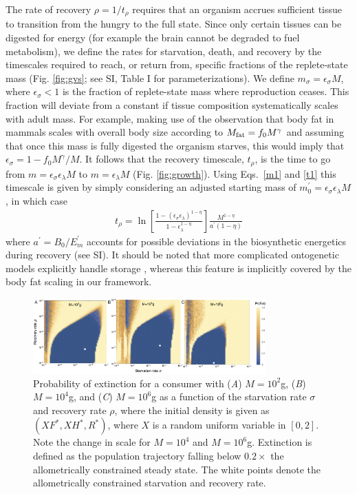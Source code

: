 \documentclass{pnastwo}
\begin{document}
\begin{article}
The rate of recovery $\rho = 1/t_\rho$ requires that an organism accrues
sufficient tissue to transition from the hungry to the full state.  Since
only certain tissues can be digested for energy (for example the brain cannot
be degraded to fuel metabolism), we define the rates for starvation, death,
and recovery by the timescales required to reach, or return from, specific
fractions of the replete-state mass (Fig. \ref{fig:gvs}; see SI, Table I for parameterizations).  We define
$m_{\sigma}=\epsilon_{\sigma} M$, where $\epsilon_{\sigma}<1$ is the fraction of
replete-state mass where reproduction ceases. This fraction will deviate from a constant
if tissue composition systematically scales with adult mass.  For example,
making use of the observation that body fat in mammals scales with overall
body size according to $M_{\rm fat}=f_{0}M^{\gamma}$ and assuming that once
this mass is fully digested the organism starves, this would imply that
$\epsilon_{\sigma}=1-f_{0}M^{\gamma}/M$. It follows that the
recovery timescale, $t_{\rho}$, is the time to go from
$m=\epsilon_{\sigma} \epsilon_{\lambda} M$ to $m=\epsilon_{\lambda}M$ (Fig. \ref{fig:growth}). Using Eqs.~\eqref{m1} and \eqref{t1} this timescale is given by simply considering an adjusted starting mass of $m_{0}^{\prime}=\epsilon_{\sigma}\epsilon_{\lambda}M$, in which case
\begin{eqnarray}
\label{rhotimescale}
t_{\rho}=\ln\left[\frac{1-\left(\epsilon_{\sigma}\epsilon_{\lambda}\right)^{1-\eta}}{1-\epsilon_\lambda^{1-\eta}}\right]\frac{M^{1-\eta}}{a^{\prime}\left(1-\eta\right)}
\end{eqnarray}
where $a^{\prime}=B_{0}/E_{m}^{\prime}$ accounts for possible deviations in the biosynthetic energetics during recovery (see SI). It should be noted that more complicated ontogenetic models explicitly handle
storage \cite{hou}, whereas this feature is implicitly covered by the body
fat scaling in our framework.

\begin{figure}
\centering
\includegraphics[width=0.8\textwidth]{fig_ExtinctionAllometricComb3.eps}
\caption{\small{ Probability of extinction for a consumer with (\emph{A}) $M=10^2$g, (\emph{B}) $M=10^4$g, and (\emph{C}) $M=10^6$g as a function of the starvation rate $\sigma$ and recovery rate $\rho$, where the initial density is given as $(XF^*,XH^*,R^*)$, where $X$ is a random uniform variable in $[0,2]$. Note the change in scale for $M=10^4$ and $M=10^6$g.  Extinction is defined as the population trajectory falling below $0.2\times$ the allometrically constrained steady state. The white points denote the allometrically constrained starvation and recovery rate.}}
\label{fig:ext}
\end{figure}



\end{article}
\end{document}

